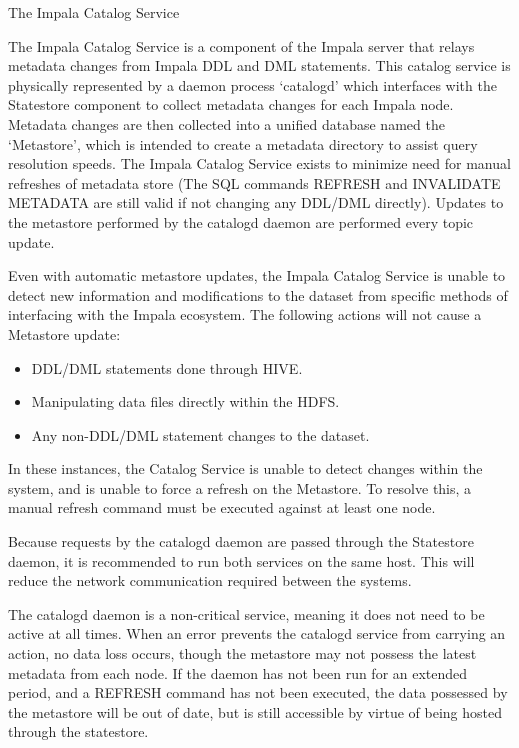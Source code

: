 \documentclass[onecolumn, draftclsnofoot,10pt, compsoc]{IEEEtran}
\begin{document}
The Impala Catalog Service

The Impala Catalog Service is a component of the Impala server that relays metadata changes from Impala DDL and DML statements.
This catalog service is physically represented by a daemon process ‘catalogd’ which interfaces with the Statestore component to collect metadata changes for each Impala node.
Metadata changes are then collected into a unified database named the ‘Metastore’, which is intended to create a metadata directory to assist query resolution speeds. 
The Impala Catalog Service exists to minimize need for manual refreshes of metadata store (The SQL commands REFRESH and INVALIDATE METADATA are still valid if not changing any DDL/DML directly). 
Updates to the metastore performed by the catalogd daemon are performed every topic update. 

Even with automatic metastore updates, the Impala Catalog Service is unable to detect new information and modifications to the dataset from specific methods of interfacing with the Impala ecosystem.
The following actions will not cause a Metastore update:

\begin{itemize}
    \item DDL/DML statements done through HIVE.
    \item Manipulating data files directly within the HDFS.
    \item Any non-DDL/DML statement changes to the dataset.
\end{itemize}

In these instances, the Catalog Service is unable to detect changes within the system, and is unable to force a refresh on the Metastore.
To resolve this, a manual refresh command must be executed against at least one node.

Because requests by the catalogd daemon are passed through the Statestore daemon, it is recommended to run both services on the same host. This will reduce the network communication required between the systems.

The catalogd daemon is a non-critical service, meaning it does not need to be active at all times.
When an error prevents the catalogd service from carrying an action, no data loss occurs, though the metastore may not possess the latest metadata from each node. 
If the daemon has not been run for an extended period, and a REFRESH command has not been executed, the data possessed by the metastore will be out of date, but is still accessible by virtue of being hosted through the statestore.
\end{document}
